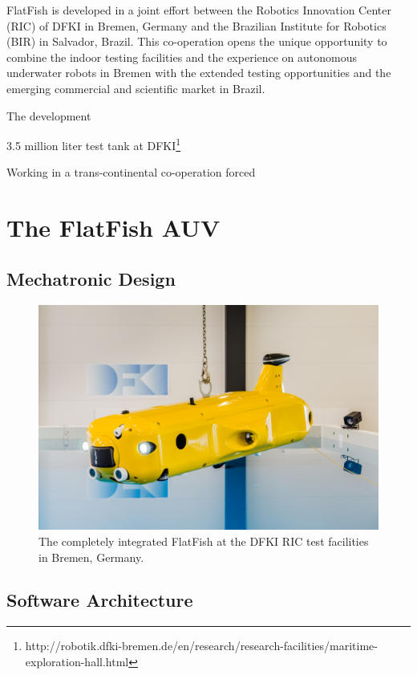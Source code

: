 \documentclass[conference]{IEEEtran}
\begin{document}
FlatFish is developed in a joint effort between the Robotics Innovation Center (RIC) of DFKI in Bremen, Germany and the Brazilian Institute for Robotics (BIR) in Salvador, Brazil. This co-operation opens the unique opportunity to combine the indoor testing facilities and the experience on autonomous underwater robots in Bremen with the extended testing opportunities and the emerging commercial and scientific market in Brazil.

The development

3.5 million liter test tank at DFKI\footnote{http://robotik.dfki-bremen.de/en/research/research-facilities/maritime-exploration-hall.html}

Working in a trans-continental co-operation forced 

\section{The FlatFish AUV}

\subsection{Mechatronic Design}


\begin{figure}[!t]
	\centering
	\includegraphics[width=0.9\columnwidth]{FlatFish-1.jpg}
	\caption{The completely integrated FlatFish at the DFKI RIC test facilities in Bremen, Germany.}
	\label{fig:flatfish1}
\end{figure}


\subsection{Software Architecture}
\end{document}

